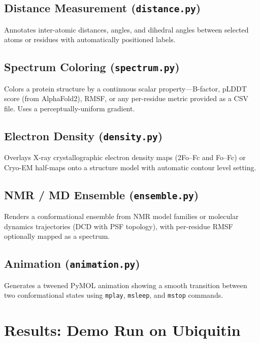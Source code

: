 \documentclass[12pt,a4paper]{article}
\begin{document}
\subsection{Distance Measurement (\texttt{distance.py})}
\label{sec:distance}

Annotates inter-atomic distances, angles, and dihedral angles between selected atoms or residues with automatically positioned labels.

\subsection{Spectrum Coloring (\texttt{spectrum.py})}
\label{sec:spectrum}

Colors a protein structure by a continuous scalar property---B-factor, pLDDT score (from AlphaFold2), RMSF, or any per-residue metric provided as a CSV file. Uses a perceptually-uniform gradient.

\subsection{Electron Density (\texttt{density.py})}
\label{sec:density}

Overlays X-ray crystallographic electron density maps (2Fo--Fc and Fo--Fc) or Cryo-EM half-maps onto a structure model with automatic contour level setting.

\subsection{NMR / MD Ensemble (\texttt{ensemble.py})}
\label{sec:ensemble}

Renders a conformational ensemble from NMR model families or molecular dynamics trajectories (DCD with PSF topology), with per-residue RMSF optionally mapped as a spectrum.

\subsection{Animation (\texttt{animation.py})}
\label{sec:animation}

Generates a tweened PyMOL animation showing a smooth transition between two conformational states using \texttt{mplay}, \texttt{msleep}, and \texttt{mstop} commands.

\section{Results: Demo Run on Ubiquitin}
\end{document}
